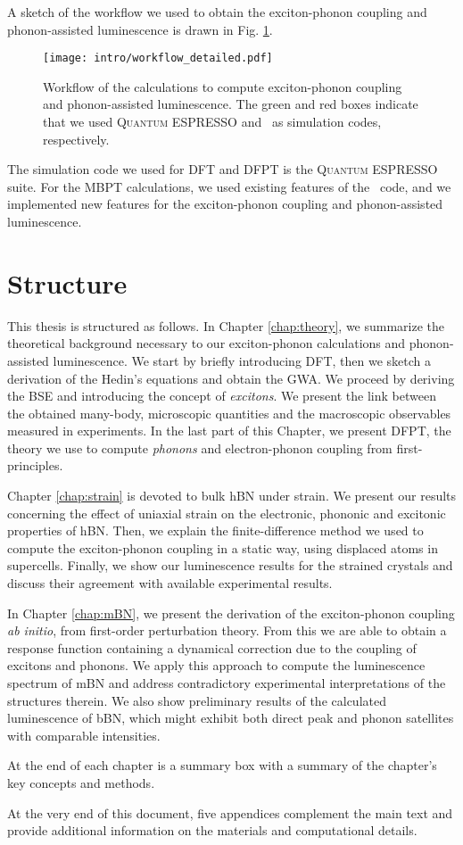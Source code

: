 A sketch of the workflow we used to obtain the exciton-phonon coupling and phonon-assisted luminescence is drawn in Fig. \ref{fig:workflow}.
\begin{figure}[t]
	\vspace{0.2cm}
	\setcapindent{2em}
	\centering
	\texttt{[image: intro/workflow\_detailed.pdf]}
	\caption{Workflow of the calculations to compute exciton-phonon coupling and phonon-assisted luminescence. The green and red boxes indicate that we used \textsc{Quantum ESPRESSO} and \yambo~as simulation codes, respectively.}
	\label{fig:workflow}
\end{figure}
The simulation code we used for \acrshort{DFT} and \acrshort{DFPT} is the \textsc{Quantum ESPRESSO} suite.\cite{giannozzi2009quantum,giannozzi2017advanced} For the \acrshort{MBPT} calculations, we used existing features of the \yambo~code,\cite{Sangalli_2019} and we implemented new features for the exciton-phonon coupling and phonon-assisted luminescence.

\section*{Structure}
This thesis is structured as follows. In Chapter \ref{chap:theory}, we summarize the theoretical background necessary to our exciton-phonon calculations and phonon-assisted luminescence. We start by briefly introducing \acrshort{DFT}, then we sketch a derivation of the Hedin's equations and obtain the \acrfull{GWA}. We proceed by deriving the \acrfull{BSE} and introducing the concept of \textit{excitons}. We present the link between the obtained many-body, microscopic quantities and the macroscopic observables measured in experiments. In the last part of this Chapter, we present \acrshort{DFPT}, the theory we use to compute \textit{phonons} and electron-phonon coupling from first-principles.

Chapter \ref{chap:strain} is devoted to bulk \acrshort{hBN} under strain. We present our results concerning the effect of uniaxial strain on the electronic, phononic and excitonic properties of \acrshort{hBN}. Then, we explain the finite-difference method we used to compute the exciton-phonon coupling in a static way, using displaced atoms in supercells. Finally, we show our luminescence results for the strained crystals and discuss their agreement with available experimental results.

In Chapter \ref{chap:mBN}, we present the derivation of the exciton-phonon coupling \textit{ab initio}, from first-order perturbation theory. From this we are able to obtain a response function containing a dynamical correction due to the coupling of excitons and phonons. We apply this approach to compute the luminescence spectrum of \acrfull{mBN} and address contradictory experimental interpretations of the structures therein. We also show preliminary results of the calculated luminescence of \acrfull{bBN}, which might exhibit both direct peak and phonon satellites with comparable intensities.
 
At the end of each chapter is a summary box with a summary of the chapter's key concepts and methods.

At the very end of this document, five appendices complement the main text and provide additional information on the materials and computational details.